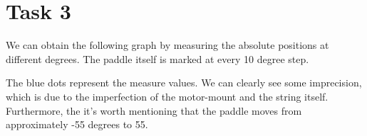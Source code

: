   \section*{Task 3}

  We can obtain the following graph by measuring the absolute positions at different degrees. The paddle itself is marked at every 10 degree step.

  \begin{figure}[H]
    \centering
  \end{figure}
  
  The blue dots represent the measure values. We can clearly see some imprecision, which is due to the imperfection of the motor-mount and the string itself. Furthermore, the it's worth mentioning that the paddle moves from approximately -55 degrees to 55.

